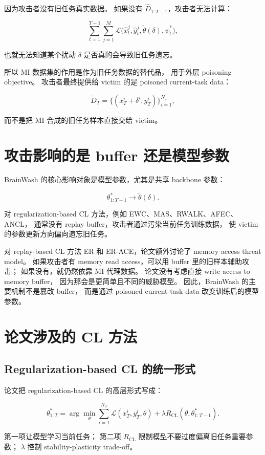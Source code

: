 \documentclass[11pt]{article}
\begin{document}
因为攻击者没有旧任务真实数据。
如果没有 \(\hat{D}_{1:T-1}\)，攻击者无法计算：

\[
\sum_{t=1}^{T-1}
\sum_{j=1}^{M}
\mathcal{L}
\bigl(
\hat{x}_t^j,\hat{y}_t^j,\tilde{\theta}(\delta),\psi_t^{*}
\bigr),
\]

也就无法知道某个扰动 \(\delta\) 是否真的会导致旧任务遗忘。

所以 MI 数据集的作用是作为旧任务数据的替代品，
用于外层 poisoning objective。
攻击者最终提供给 victim 的是 poisoned current-task data：

\[
\tilde{D}_T
=
\{(x_T^i+\delta^i,y_T^i)\}_{i=1}^{N_T},
\]

而不是把 MI 合成的旧任务样本直接交给 victim。

\section{攻击影响的是 buffer 还是模型参数}

BrainWash 的核心影响对象是模型参数，尤其是共享 backbone 参数：

\[
\theta_{1:T-1}^{*}
\longrightarrow
\tilde{\theta}(\delta).
\]

对 regularization-based CL 方法，例如 EWC、MAS、RWALK、AFEC、ANCL，
通常没有 replay buffer，攻击者通过污染当前任务训练数据，
使 victim 的参数更新方向偏向遗忘旧任务。

对 replay-based CL 方法 ER 和 ER-ACE，论文额外讨论了 memory access threat model。
如果攻击者有 memory read access，可以用 buffer 里的旧样本辅助攻击；
如果没有，就仍然依靠 MI 代理数据。
论文没有考虑直接 write access to memory buffer，
因为那会是更简单且不同的威胁模型。
因此，BrainWash 的主要机制不是篡改 buffer，
而是通过 poisoned current-task data 改变训练后的模型参数。

\section{论文涉及的 CL 方法}

\subsection{Regularization-based CL 的统一形式}

论文把 regularization-based CL 的高层形式写成：

\[
\theta_{1:T}^{*}
=
\arg\min_{\theta}
\sum_{i=1}^{N_T}
\mathcal{L}(x_T^i,y_T^i,\theta)
+
\lambda
R_{\mathrm{CL}}(\theta,\theta_{1:T-1}^{*}).
\]

第一项让模型学习当前任务；
第二项 \(R_{\mathrm{CL}}\) 限制模型不要过度偏离旧任务重要参数；
\(\lambda\) 控制 stability-plasticity trade-off。
\end{document}

